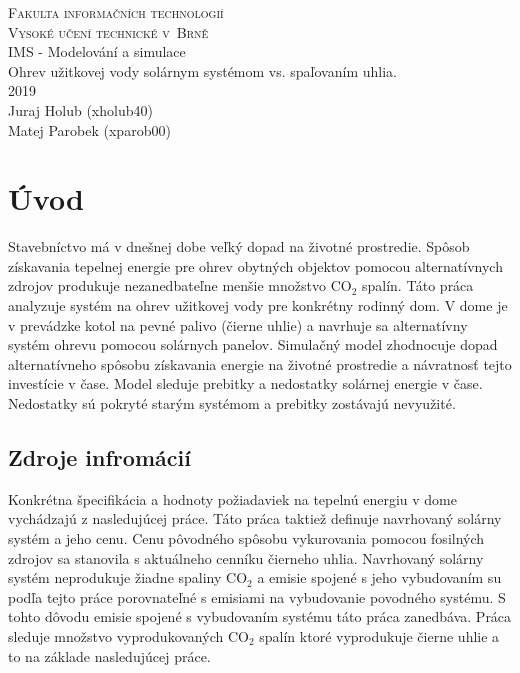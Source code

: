 \documentclass[a4paper, 11pt]{article}
\begin{document}
\begin{titlepage}
	\begin{center}
		\Huge
		\textsc{Fakulta informačních technologií \\
			Vysoké učení technické v~Brně} \\
		{\LARGE
			IMS - Modelování a simulace \\ 
			\medskip 
			\Large{
				Ohrev užitkovej vody solárnym systémom vs. spaľovaním uhlia.
			}
			}
		\setlength{\parindent}{0.3em}\\
		{\Large 2019} \\
		{\Large Juraj Holub (xholub40)}\\
		{\Large Matej Parobek (xparob00)}
	\end{center}
\end{titlepage}

\tableofcontents
\newpage

\section{Úvod}
Stavebníctvo má v dnešnej dobe veľký dopad na životné prostredie. Spôsob získavania tepelnej energie pre ohrev obytných objektov pomocou alternatívnych zdrojov produkuje nezanedbateľne menšie množstvo CO$_2$ spalín. Táto práca analyzuje systém na ohrev užitkovej vody pre konkrétny rodinný dom. V dome je v prevádzke kotol na pevné palivo (čierne uhlie) a navrhuje sa alternatívny systém ohrevu pomocou solárnych panelov. Simulačný model zhodnocuje dopad alternatívneho spôsobu získavania energie na životné prostredie a návratnosť tejto investície v čase. Model sleduje prebitky a nedostatky solárnej energie v čase. Nedostatky sú pokryté starým systémom a prebitky zostávajú nevyužité.

\subsection{Zdroje infromácií}
Konkrétna špecifikácia a hodnoty požiadaviek na tepelnú energiu v dome vychádzajú z nasledujúcej práce. Táto práca taktiež definuje navrhovaný solárny systém a jeho cenu. Cenu pôvodného spôsobu vykurovania pomocou fosilných zdrojov sa stanovila s aktuálneho cenníku čierneho uhlia. Navrhovaný solárny systém neprodukuje žiadne spaliny CO$_2$ a emisie spojené s jeho vybudovaním su podľa tejto práce porovnateľné s emisiami na vybudovanie povodného systému. S tohto dôvodu emisie spojené s vybudovaním systému táto práca zanedbáva. Práca sleduje množstvo vyprodukovaných CO$_2$ spalín ktoré vyprodukuje čierne uhlie a to na základe nasledujúcej práce. 
\end{document}
